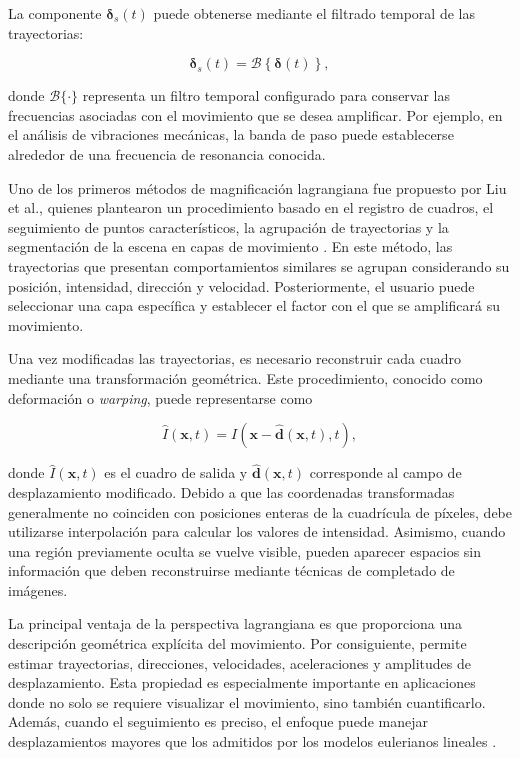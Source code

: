 La componente $\boldsymbol{\delta}_{s}(t)$ puede obtenerse mediante el filtrado temporal de las trayectorias:

\begin{equation}
    \boldsymbol{\delta}_{s}(t)
    =
    \mathcal{B}
    \left\{
        \boldsymbol{\delta}(t)
    \right\},
    \label{eq:filtrado_trayectoria}
\end{equation}

donde $\mathcal{B}\{\cdot\}$ representa un filtro temporal configurado para conservar las frecuencias asociadas con el movimiento que se desea amplificar. Por ejemplo, en el análisis de vibraciones mecánicas, la banda de paso puede establecerse alrededor de una frecuencia de resonancia conocida.

Uno de los primeros métodos de magnificación lagrangiana fue propuesto por Liu et al., quienes plantearon un procedimiento basado en el registro de cuadros, el seguimiento de puntos característicos, la agrupación de trayectorias y la segmentación de la escena en capas de movimiento \cite{liu2005motion}. En este método, las trayectorias que presentan comportamientos similares se agrupan considerando su posición, intensidad, dirección y velocidad. Posteriormente, el usuario puede seleccionar una capa específica y establecer el factor con el que se amplificará su movimiento.

Una vez modificadas las trayectorias, es necesario reconstruir cada cuadro mediante una transformación geométrica. Este procedimiento, conocido como deformación o \textit{warping}, puede representarse como

\begin{equation}
    \widehat{I}(\mathbf{x},t)
    =
    I\left(
        \mathbf{x}
        -
        \widehat{\mathbf{d}}(\mathbf{x},t),
        t
    \right),
    \label{eq:warping_lagrangiano}
\end{equation}

donde $\widehat{I}(\mathbf{x},t)$ es el cuadro de salida y $\widehat{\mathbf{d}}(\mathbf{x},t)$ corresponde al campo de desplazamiento modificado. Debido a que las coordenadas transformadas generalmente no coinciden con posiciones enteras de la cuadrícula de píxeles, debe utilizarse interpolación para calcular los valores de intensidad. Asimismo, cuando una región previamente oculta se vuelve visible, pueden aparecer espacios sin información que deben reconstruirse mediante técnicas de completado de imágenes.

La principal ventaja de la perspectiva lagrangiana es que proporciona una descripción geométrica explícita del movimiento. Por consiguiente, permite estimar trayectorias, direcciones, velocidades, aceleraciones y amplitudes de desplazamiento. Esta propiedad es especialmente importante en aplicaciones donde no solo se requiere visualizar el movimiento, sino también cuantificarlo. Además, cuando el seguimiento es preciso, el enfoque puede manejar desplazamientos mayores que los admitidos por los modelos eulerianos lineales \cite{ahmed2023overview}.

